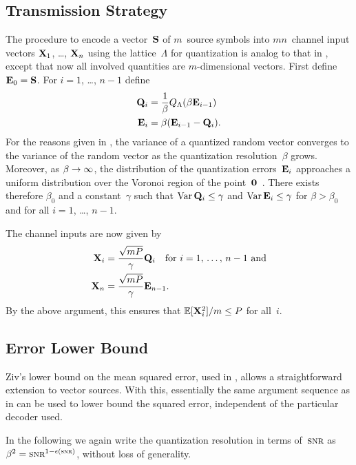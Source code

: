 \subsection{Transmission Strategy}

The procedure to encode a vector~$\S$ of $m$~source symbols into $mn$~channel
input vectors $\X_1$, \ldots, $\X_n$ using the lattice~$\Lambda$ for
quantization is analog to that in , except that now all
involved quantities are $m$-dimensional vectors. First define $\Evc_0 = \S$.
For $i = 1$, \ldots, $n-1$ define
\begin{align}
  \Q_i &= \frac{1}{\beta} \QL(\beta \Evc_{i-1})  \nonumber \\
  \Evc_i &= \beta ( \Evc_{i-1} - \Q_i). \label{eq:latticeQE}
\end{align}
For the reasons given in , the variance of a quantized
random vector converges to the variance of the random vector as the quantization
resolution~$\beta$ grows. Moreover, as $\beta \goesto \infty$, the distribution
of the quantization errors~$\Evc_i$ approaches a uniform distribution over the
Voronoi region of the point~$\vz$~\cite{ZamirF1996}. There exists therefore
$\beta_0$ and a constant~$\gamma$ such that $\Var \Q_i \le \gamma$ and
$\Var \Evc_i \le \gamma$  for $\beta > \beta_0$ and for all $i = 1$, \ldots,
$n-1$. 

The channel inputs are now given by
\begin{align*}
  \X_i &= \frac{\sqrt{mP}}{\gamma} \Q_i \quad \text{for $i = 1$, \dots, $n-1$ and}
  \\
  \X_n &= \frac{\sqrt{mP}}{\gamma} \Evc_{n-1}.
\end{align*}
By the above argument, this ensures that $\E[\X_i^2]/m \le P$ for all~$i$.



\subsection{Error Lower Bound}

Ziv's lower bound on the mean squared error, used in ,
allows a straightforward extension to vector sources. With this, essentially the
same argument sequence as in  can be used to lower bound the
squared error, independent of the particular decoder used.

In the following we again write the quantization resolution in terms of~$\snr$
as $\beta^2 = \snr^{1-\e(\snr)}$, without loss of generality.

